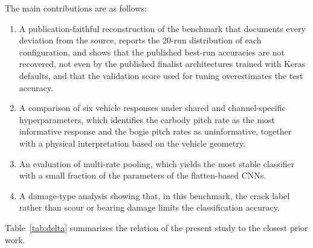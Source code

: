 The main contributions are as follows:
\begin{enumerate}
  \item A publication-faithful reconstruction of the benchmark that documents
  every deviation from the source, reports the 20-run distribution of each
  configuration, and shows that the published best-run accuracies are not
  recovered, not even by the published finalist architectures trained with
  Keras defaults, and that the validation score used for tuning overestimates
  the test accuracy.
  \item A comparison of six vehicle responses under shared and channel-specific
  hyperparameters, which identifies the carbody pitch rate as the most
  informative response and the bogie pitch rates as uninformative, together
  with a physical interpretation based on the vehicle geometry.
  \item An evaluation of multi-rate pooling, which yields the most stable
  classifier with a small fraction of the parameters of the flatten-based CNNs.
  \item A damage-type analysis showing that, in this benchmark, the crack
  label rather than scour or bearing damage limits the classification
  accuracy.
\end{enumerate}

Table~\ref{tab:delta} summarizes the relation of the present study to the
closest prior work.

